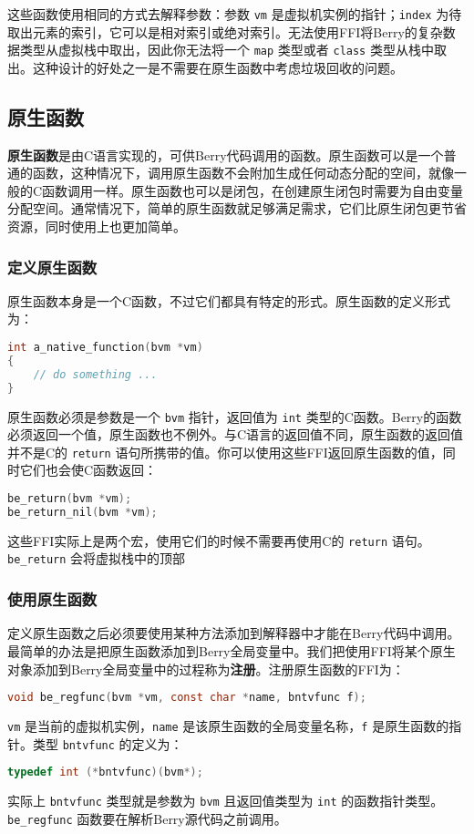这些函数使用相同的方式去解释参数：参数 \texttt{vm} 是虚拟机实例的指针；\texttt{index} 为待取出元素的索引，它可以是相对索引或绝对索引。无法使用FFI将Berry的复杂数据类型从虚拟栈中取出，因此你无法将一个 \texttt{map} 类型或者 \texttt{class} 类型从栈中取出。这种设计的好处之一是不需要在原生函数中考虑垃圾回收的问题。

\subsection{原生函数}

\textbf{原生函数}是由C语言实现的，可供Berry代码调用的函数。原生函数可以是一个普通的函数，这种情况下，调用原生函数不会附加生成任何动态分配的空间，就像一般的C函数调用一样。原生函数也可以是闭包，在创建原生闭包时需要为自由变量分配空间。通常情况下，简单的原生函数就足够满足需求，它们比原生闭包更节省资源，同时使用上也更加简单。

\subsubsection{定义原生函数}

原生函数本身是一个C函数，不过它们都具有特定的形式。原生函数的定义形式为：
\begin{lstlisting}[language=c, style=berry, numbers=none]
int a_native_function(bvm *vm)
{
    // do something ...
}
\end{lstlisting}
原生函数必须是参数是一个 \texttt{bvm} 指针，返回值为 \texttt{int} 类型的C函数。Berry的函数必须返回一个值，原生函数也不例外。与C语言的返回值不同，原生函数的返回值并不是C的 \texttt{return} 语句所携带的值。你可以使用这些FFI返回原生函数的值，同时它们也会使C函数返回：
\begin{lstlisting}[language=c, style=berry, numbers=none]
be_return(bvm *vm);
be_return_nil(bvm *vm);
\end{lstlisting}
这些FFI实际上是两个宏，使用它们的时候不需要再使用C的 \texttt{return} 语句。\texttt{be\_return} 会将虚拟栈中的顶部

\subsubsection{使用原生函数}

定义原生函数之后必须要使用某种方法添加到解释器中才能在Berry代码中调用。最简单的办法是把原生函数添加到Berry全局变量中。我们把使用FFI将某个原生对象添加到Berry全局变量中的过程称为\textbf{注册}。注册原生函数的FFI为：
\begin{lstlisting}[language=c, style=berry, numbers=none]
void be_regfunc(bvm *vm, const char *name, bntvfunc f);
\end{lstlisting}
\texttt{vm} 是当前的虚拟机实例，\texttt{name} 是该原生函数的全局变量名称，\texttt{f} 是原生函数的指针。类型 \texttt{bntvfunc} 的定义为：
\begin{lstlisting}[language=c, style=berry, numbers=none]
typedef int (*bntvfunc)(bvm*);
\end{lstlisting}
实际上 \texttt{bntvfunc} 类型就是参数为 \texttt{bvm} 且返回值类型为 \texttt{int} 的函数指针类型。\texttt{be\_regfunc} 函数要在解析Berry源代码之前调用。

